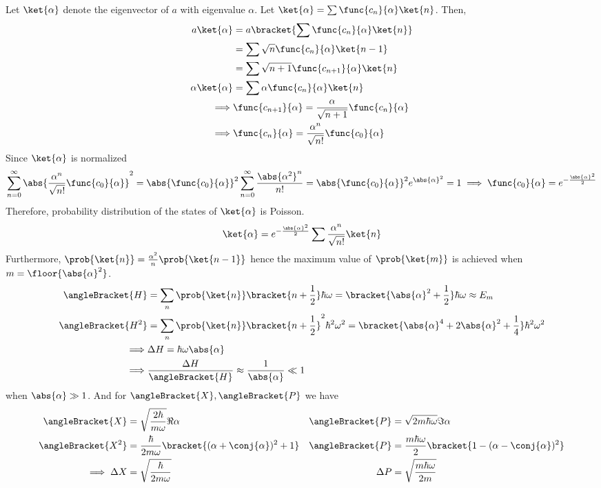 Let \(\ket{\alpha}\) denote the eigenvector of \(a\) with eigenvalue \(\alpha\). Let \(\ket{\alpha} = \sum \func{c_n}{\alpha} \ket{n}\). Then, 
\begin{align*}
    a \ket{\alpha} &= a \bracket{\sum \func{c_n}{\alpha} \ket{n}} \\
    &= \sum \sqrt{n}\func{c_n}{\alpha}\ket{n - 1}\\
    &= \sum \sqrt{n + 1}\func{c_{n+1}}{\alpha}\ket{n}\\
    \alpha \ket{\alpha}&= \sum \alpha\func{c_{n}}{\alpha}\ket{n}\\
    \implies & \func{c_{n+1}}{\alpha} = \dfrac{\alpha}{\sqrt{n+1}} \func{c_n}{\alpha} \\
    \implies & \func{c_n}{\alpha} = \dfrac{\alpha^{n}}{\sqrt{n!}} \func{c_0}{\alpha}
\end{align*}
Since \(\ket{\alpha}\) is normalized
\begin{equation*}
    \sum_{n = 0}^{\infty} \abs{\dfrac{\alpha^{n}}{\sqrt{n!}} \func{c_0}{\alpha}}^2 = \abs{\func{c_0}{\alpha}}^2 \sum_{n= 0}^{\infty} \dfrac{\abs{\alpha^2}^n}{n!} = \abs{\func{c_0}{\alpha}}^2 e^{\abs{\alpha}^2} = 1 \implies \func{c_0}{\alpha} = e^{- \frac{\abs{\alpha}^2}{2}}
\end{equation*}
Therefore, probability distribution of the states of \(\ket{\alpha}\) is Poisson.
\begin{equation*}
    \ket{\alpha} = e^{- \frac{\abs{\alpha}^2}{2}} \sum \frac{\alpha^n}{\sqrt{n!}} \ket{n}
\end{equation*}
Furthermore, \(\prob{\ket{n}} = \frac{\alpha^2}{n} \prob{\ket{n-1}}\) hence the maximum value of \(\prob{\ket{m}}\) is achieved when \(m = \floor{\abs{\alpha}^2}\). 
\begin{align*}
    \angleBracket{H} &= \sum_n \prob{\ket{n}} \bracket{n + \frac{1}{2}}\hbar \omega = \bracket{\abs{\alpha}^2 + \frac{1}{2}}\hbar \omega \approx E_m\\
    \angleBracket{H^2} &= \sum_n \prob{\ket{n}} \bracket{n + \frac{1}{2}}^2\hbar^2 \omega^2 = \bracket{\abs{\alpha}^4 +2 \abs{\alpha}^2 + \frac{1}{4}}\hbar^2 \omega^2 \\
    \implies& \Delta H = \hbar \omega \abs{\alpha}\\
    \implies& \dfrac{\Delta H}{\angleBracket{H}} \approx \frac{1}{\abs{\alpha}} \ll 1
\end{align*}
when \(\abs{\alpha} \gg 1\). And for \(\angleBracket{X}, \angleBracket{P}\) we have 
\begin{align*}
    \angleBracket{X}&= \sqrt{\dfrac{2\hbar}{m \omega}} \Re{\alpha} & \angleBracket{P} &= \sqrt{2m \hbar \omega} \Im \alpha \\
    \angleBracket{X^2}&= \dfrac{\hbar}{2m \omega} \bracket{(\alpha + \conj{\alpha})^2 + 1} & \angleBracket{P} &= \frac{m \hbar \omega}{2} \bracket{1- (\alpha - \conj{\alpha})^2}  \\
    \implies \Delta X  &= \sqrt{\dfrac{\hbar}{2 m \omega}} & \Delta P &= \sqrt{\dfrac{m\hbar \omega}{2 m }} 
\end{align*}
